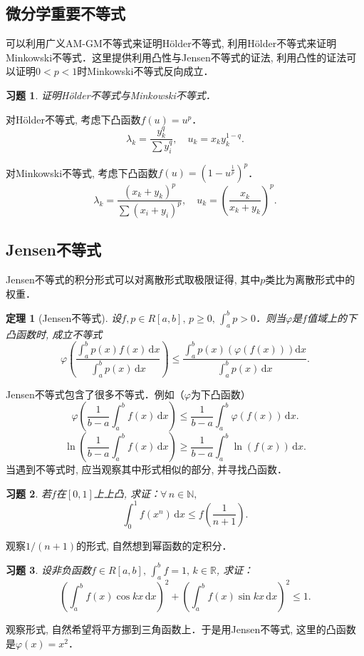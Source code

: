 \documentclass[11pt,a4paper]{ctexart}
\makeatletter
\theoremstyle{thmseries} %
\newtheorem{thm}{定理}[section]
\theoremstyle{exerseries}
\newtheorem{exer}{习题}[section]
\renewenvironment{proof}[1][\proofname]{\par
  \pushQED{\qed}%
  \normalfont \topsep6\p@\@plus6\p@\relax
  \trivlist
  \item[\hskip\labelsep
        \itshape
    #1\@addpunct{}]\ignorespaces
}{%
  \popQED\endtrivlist\@endpefalse
}
\newenvironment{pf}{\begin{proof}[\bfseries\upshape 证\quad]}{\end{proof}}
\newcommand{\bra}[1]{\mathopen{}\left(#1\right)}
\renewcommand{\phi}{\varphi}
\newcommand{\R}{\mathbb{R}}
\newcommand{\N}{\mathbb{N}}
\renewcommand{\d}{\mathrm{d}}
\makeatother
\begin{document}
\subsection{微分学重要不等式}
可以利用广义AM-GM不等式来证明H\"older不等式, 利用H\"older不等式来证明Minkowski不等式．这里提供利用凸性与Jensen不等式的证法, 利用凸性的证法可以证明$0<p<1$时Minkowski不等式反向成立．
\begin{exer}
	证明H\"older不等式与Minkowski不等式．
\end{exer}
\begin{pf}
	对H\"older不等式, 考虑下凸函数$f(u)=u^p$．
	\[\lambda_k=\frac{y_k^q}{\sum y_i^q},\quad u_k=x_ky_k^{1-q}.\]

	对Minkowski不等式, 考虑下凸函数$f(u)=\bra{1-u^{\frac{1}{p}}}^p$．
	\[\lambda_k=\frac{(x_k+y_k)^p}{\sum(x_i+y_i)^p},\quad u_k=\bra{\frac{x_k}{x_k+y_k}}^p.\]
\end{pf}


\subsection{Jensen不等式}
Jensen不等式的积分形式可以对离散形式取极限证得, 其中$p$类比为离散形式中的权重．
\begin{thm}[Jensen不等式]
	设$f,p\in R[a,b],\,p\geq0,\,\int_{a}^{b}p>0$．则当$\phi$是$f$值域上的下凸函数时, 成立不等式
	\[\phi\bra{\frac{\int_{a}^{b}p(x)f(x)\,\d x}{\int_{a}^{b}p(x)\,\d x}}\leq\frac{\int_{a}^{b}p(x)\bra{\phi(f(x))}\d x}{\int_{a}^{b}p(x)\,\d x}.\]
\end{thm}

Jensen不等式包含了很多不等式．例如（$\phi$为下凸函数）
\[\phi\bra{\frac{1}{b-a}\int_{a}^{b}f(x)\,\d x}\leq\frac{1}{b-a}\int_{a}^{b}\phi(f(x))\,\d x.\]
\[\ln\bra{\frac{1}{b-a}\int_{a}^{b}f(x)\,\d x}\geq\frac{1}{b-a}\int_{a}^{b}\ln(f(x))\,\d x.\]
当遇到不等式时, 应当观察其中形式相似的部分, 并寻找凸函数．

\begin{exer}
	若$f$在$[0,1]$上上凸, 求证：$\forall\,n\in\N,$
	\[\int_{0}^{1}f(x^n)\,\d x\leq f\bra{\frac{1}{n+1}}.\]
\end{exer}
\begin{pf}
	观察$1/(n+1)$的形式, 自然想到幂函数的定积分．
\end{pf}

\begin{exer}
	设非负函数$f\in R[a,b],\,\int_{a}^{b}f=1,\,k\in\R$, 求证：
	\[\bra{\int_{a}^{b}f(x)\cos kx\,\d x}^2+\bra{\int_{a}^{b}f(x)\sin kx\,\d x}^2\leq1.\]
\end{exer}
\begin{pf}
	观察形式, 自然希望将平方挪到三角函数上．于是用Jensen不等式, 这里的凸函数是$\phi(x)=x^2$．
\end{pf}
\end{document}
